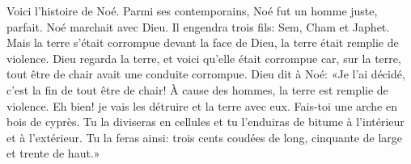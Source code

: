 Voici l’histoire de Noé.
Parmi ses contemporains, Noé fut un homme juste, parfait.
	Noé marchait avec Dieu.
Il engendra trois fils: Sem, Cham et Japhet.
Mais la terre s’était corrompue devant la face de Dieu,
	la terre était remplie de violence.
Dieu regarda la terre, et voici qu’elle était corrompue
	car, sur la terre, tout être de chair avait une conduite corrompue.
Dieu dit à Noé: «Je l’ai décidé, c’est la fin de tout être de chair!
	À cause des hommes, la terre est remplie de violence.
	Eh bien! je vais les détruire et la terre avec eux.
Fais-toi une arche en bois de cyprès.
	Tu la diviseras en cellules et tu l’enduiras de bitume
	à l’intérieur et à l’extérieur.
Tu la feras ainsi:
	trois cents coudées de long, cinquante de large et trente de haut.»
